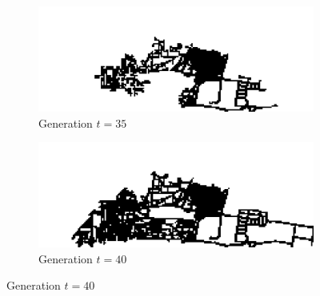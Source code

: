 \begin{figure}[H]
\begin{subfigure}{.5\textwidth}
  \centering
  \includegraphics[width=1\linewidth]{Figures/Chapter4/generation-35-melusi}
  \caption*{Generation $t = 35$}
\end{subfigure}
\begin{subfigure}{.5\textwidth}
  \centering
  \includegraphics[width=1\linewidth]{Figures/Chapter4/generation-40-melusi}
  \caption*{Generation $t = 40$}
\end{subfigure}
\end{figure}

